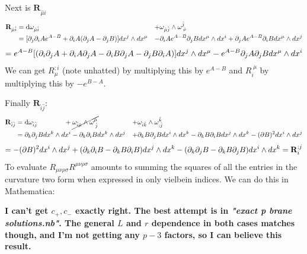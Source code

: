 \documentclass[11pt, class=article, crop=false]{standalone}
\begin{document}
\begin{enumerate}
	Next is $\mathbf{R}_{\hat \mu \hat i}$
	\[
	\begin{aligned}
		\mathbf{R}_{\hat \mu \hat i} &= \mathrm{d} \omega_{\hat \mu \hat i} &+& \omega_{\hat \mu \hat j} \wedge \omega^{\hat j}_{\; \hat \nu}\\ 
		&= [\partial_j \partial_i A e^{A-B} + \partial_i A (\partial_j A - \partial_j B)] dx^j \wedge dx^\mu & - & \partial_i A e^{A-B} \partial_j B dx^\mu \wedge dx^i + \partial_j A e^{A-B} \partial_i B dx^\mu \wedge d x^j\\
 	\end{aligned}
	\]
	\[
			= e^{A-B}[(\partial_i \partial_j A + \partial_i A \partial_j A - \partial_i B \partial_j A - \partial_j B \partial_i A)] dx^j \wedge dx^\mu - e^{A-B} \partial_j A \partial_j B dx^\mu \wedge d x^i
	\]
	We can get $R_{\mu}^{;i}$ (note unhatted) by multiplying this by $e^{A-B}$ and $R_{i}^{\; \mu}$ by multiplying this by $- e^{B-A}$. 
	
	Finally $\mathbf{R}_{\hat i \hat j}$:
	\[
	\begin{aligned}
		\mathbf{R}_{\hat i \hat j} &= \mathrm{d} \omega_{\hat i\hat j} \qquad \qquad +  \cancel{\omega_{\hat i \hat \mu} \wedge \omega^{\hat \mu}_{\; \hat j}} &+& \omega_{\hat i \hat k} \wedge \omega^{\hat k}_{; \hat j} \\ 
		&= \partial_k \partial_j B dx^k \wedge dx^i - \partial_k \partial_i B dx^k \wedge dx^j & + & \partial_k B \partial_j B dx^i \wedge dx^k - \partial_k B \partial_i B dx^j \wedge dx^k - (\partial B)^2 dx^i \wedge dx^j \\
 	\end{aligned}
	\]
	\[
		= -(\partial B)^2 dx^i \wedge dx^j + (\partial_k \partial_i B - \partial_k B \partial_i B) dx^j \wedge dx^k - (\partial_k \partial_j B - \partial_k B \partial_j B) dx^i \wedge dx^k = \mathbf{R}_i^{;j}
	\]
	To evaluate $R_{\mu \nu \rho \sigma} R^{\mu \nu \rho \sigma}$ amounts to summing the squares of all the entries in the curvature two form when expressed in only vielbein indices. We can do this in Mathematica:
	
	\textbf{I can't get $c_+, c_-$ exactly right. The best attempt is in \emph{"exact p brane solutions.nb"}. The general $L$ and $r$ dependence in both cases matches though, and I'm not getting any $p-3$ factors, so I can believe this result.}
	

\end{enumerate}
\end{document}
